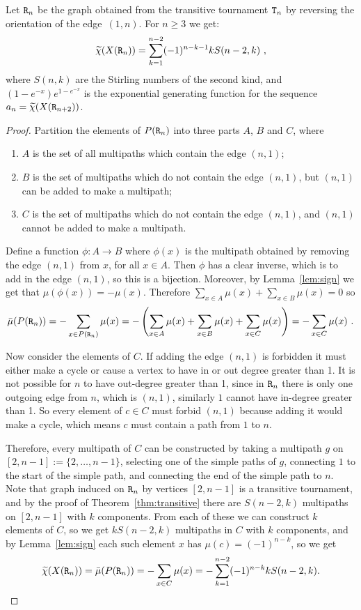 \documentclass{amsart}
\begin{document}
  \begin{thm}\label{thm:transitive2}
  Let ${\tt R}_n$ be the graph obtained from the transitive tournament ${\tt T}_n$ by reversing the orientation of the edge~$(1,n)$.
 For $n\ge3$ we get:
\begin{equation}\label{eq:aTT}\widetilde{\chi}(X({\tt R}_n))=\sum_{k=1}^{n-2}(-1)^{n-k-1}k S(n-2,k)\ ,\end{equation}
 where $S(n,k)$ are the Stirling numbers of the second kind, and $(1-e^{-x})e^{1-e^{-x}}$ is the exponential generating function for the sequence $a_n=\widetilde{\chi}(X({\tt R}_{n+2}))$.
 \begin{proof}
  Partition the elements of $P({\tt R}_n)$ into three parts $A$, $B$ and $C$, where
  \begin{enumerate}
      \item $A$ is the set of all multipaths which contain the edge $(n,1)$;
      \item $B$ is the set of multipaths which do not contain the edge $(n,1)$, but $(n,1)$ can be added to make a multipath;
      \item $C$ is the set of multipaths which do not contain the edge $(n,1)$, and $(n,1)$ cannot be added to make a multipath.
  \end{enumerate}
  Define a function $\phi\colon A\rightarrow B$ where $\phi(x)$ is the multipath obtained by removing the edge $(n,1)$
  from $x$, for all $x\in A$. Then $\phi$ has a clear inverse, which is to add in the edge $(n,1)$, so this is a
  bijection. Moreover, by Lemma~\ref{lem:sign} we get that $\mu(\phi(x))=-\mu(x)$. 
  Therefore $\sum_{x\in A}\mu(x)+\sum_{x\in B}\mu(x)=0$ so
  $$\bar{\mu}(P({\tt R}_n))=-\sum_{x\in P({\tt R}_n)}\mu(x)=-\left(\sum_{x\in A}\mu(x)+\sum_{x\in B}\mu(x)+\sum_{x\in C}\mu(x)\right)=-\sum_{x\in C}\mu(x)\ .$$
  
  Now consider the elements of $C$. If adding the edge $(n,1)$ is forbidden it must either make a cycle
  or cause a vertex to have in or out degree greater than 1. It is not possible for $n$ to have out-degree greater
  than 1, since in ${\tt R}_n$ there is only one outgoing edge from $n$, which is $(n,1)$, similarly $1$ cannot have in-degree greater than
  1. So every element of $c\in C$ must forbid $(n,1)$ because adding it would make a cycle, which means $c$ must
  contain a path from $1$ to $n$. 
  
  Therefore, every multipath of $C$ can be constructed by taking a multipath $g$ on $[2,n-1]:=\{2,\ldots,n-1\}$,
  selecting one of the simple paths of $g$, connecting $1$ to the
  start of the simple path, and connecting the end of the simple path to $n$.
  Note that graph induced on ${\tt R}_n$ by vertices $[2,n-1]$ is a transitive tournament, and by the proof of Theorem~\ref{thm:transitive} there are $S(n-2,k)$ multipaths on $[2,n-1]$ with $k$ components. From each of these we can construct $k$ elements of $C$, so we get $kS(n-2,k)$ multipaths in $C$ with $k$ components, and by Lemma~\ref{lem:sign} each such element $x$ has $\mu(c)=(-1)^{n-k}$, so we get
  $$\widetilde{\chi}(X({\tt R}_n))=\bar{\mu}(P({\tt R}_n))=-\sum_{x\in C}\mu(x)=-\sum_{k=1}^{n-2}(-1)^{n-k}kS(n-2,k).$$
  

\end{proof}
\end{thm}
\end{document}
